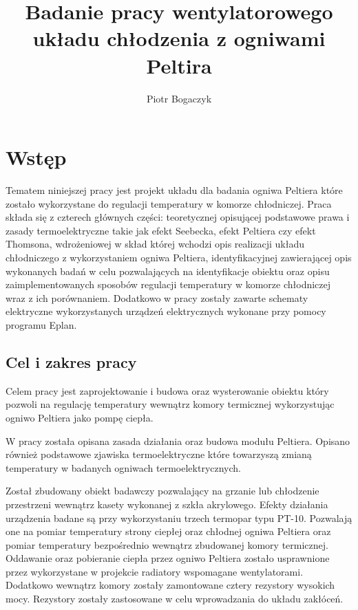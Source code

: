 \documentclass[oneside]{mgr}
\title{Badanie pracy wentylatorowego układu chłodzenia z ogniwami Peltira}
\author{Piotr Bogaczyk}
\begin{document}
\maketitle
\tableofcontents

\chapter{Wstęp}
Tematem niniejszej pracy jest projekt układu dla badania ogniwa Peltiera które zostało wykorzystane do regulacji temperatury w komorze chłodniczej. Praca składa się z czterech głównych części: teoretycznej opisującej podstawowe prawa i zasady termoelektryczne takie jak efekt Seebecka, efekt Peltiera czy efekt Thomsona, wdrożeniowej w skład której wchodzi opis realizacji układu chłodniczego z wykorzystaniem ogniwa Peltiera, identyfikacyjnej zawierającej opis wykonanych badań w celu pozwalających na identyfikacje obiektu oraz opisu zaimplementowanych sposobów regulacji temperatury w komorze chłodniczej wraz z ich porównaniem. Dodatkowo w pracy zostały zawarte schematy elektryczne wykorzystanych urządzeń elektrycznych wykonane przy pomocy programu Eplan.

\section{Cel i zakres pracy}

Celem pracy jest zaprojektowanie i budowa oraz wysterowanie obiektu który pozwoli na regulację temperatury wewnątrz komory termicznej wykorzystując ogniwo Peltiera jako pompę ciepła.

W pracy została opisana zasada działania oraz budowa modułu Peltiera. Opisano również podstawowe zjawiska termoelektryczne które towarzyszą zmianą temperatury w badanych ogniwach termoelektrycznych.

Został zbudowany obiekt badawczy pozwalający na grzanie lub chłodzenie przestrzeni wewnątrz kasety wykonanej z szkła akrylowego. Efekty działania urządzenia badane są przy wykorzystaniu trzech termopar typu PT-10. Pozwalają one na pomiar temperatury strony ciepłej oraz chłodnej ogniwa Peltiera oraz pomiar temperatury bezpośrednio wewnątrz zbudowanej komory termicznej. Oddawanie oraz pobieranie ciepła przez ogniwo Peltiera zostało usprawnione przez wykorzystane w projekcie radiatory wspomagane wentylatorami. Dodatkowo wewnątrz komory zostały zamontowane cztery rezystory wysokich mocy. Rezystory zostały zastosowane w celu wprowadzania do układu zakłóceń.
\end{document}

